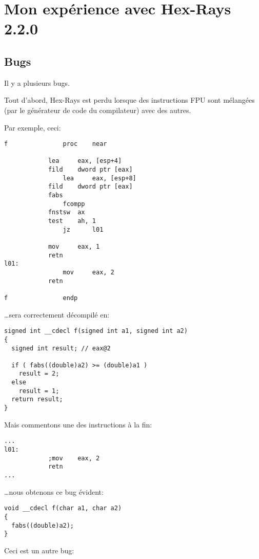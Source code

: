 ﻿\section{Mon expérience avec Hex-Rays 2.2.0}
\label{hex_rays}

\subsection{Bugs}

Il y a plusieurs bugs.

Tout d'abord, Hex-Rays est perdu lorsque des instructions \ac{FPU} sont mélangées
(par le générateur de code du compilateur) avec des autres.

Par exemple, ceci:

\begin{lstlisting}
f               proc    near

        	lea     eax, [esp+4]
	        fild    dword ptr [eax]
                lea     eax, [esp+8]
        	fild    dword ptr [eax]
	        fabs
                fcompp
        	fnstsw  ax
	        test    ah, 1
                jz      l01

        	mov     eax, 1
	        retn
l01:
                mov     eax, 2
	        retn

f               endp
\end{lstlisting}

\dots sera correctement décompilé en:

\begin{lstlisting}
signed int __cdecl f(signed int a1, signed int a2)
{
  signed int result; // eax@2

  if ( fabs((double)a2) >= (double)a1 )
    result = 2;
  else
    result = 1;
  return result;
}
\end{lstlisting}

Mais commentons une des instructions à la fin:

\begin{lstlisting}
...
l01:
	        ;mov    eax, 2
        	retn
...
\end{lstlisting}

\dots nous obtenons ce bug évident:

\begin{lstlisting}
void __cdecl f(char a1, char a2)
{
  fabs((double)a2);
}
\end{lstlisting}

Ceci est un autre bug:

